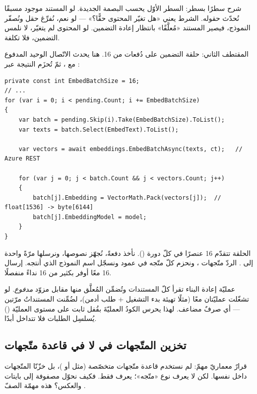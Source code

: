 شرح سطرًا بسطر: السطر الأوّل يحسب البصمة الجديدة. لو المستند موجود مسبقًا نُحدّث
حقوله. الشرط  يعني «هل تغيّر المحتوى حقًّا؟» — لو نعم،
نُفرِّغ حقل  ونُصفّر النموذج، فيصير المستند «مُعلَّقًا» بانتظار إعادة
التضمين. لو المحتوى لم يتغيّر، لا نلمس التضمين، فلا تكلفة.

المقتطف الثاني: حلقة التضمين على دُفعات من 16. هنا يحدث الاتّصال الوحيد المدفوع مع
، ثمّ تُحزَم النتيجة عبر :

\begin{english}
\begin{lstlisting}[language={[Sharp]C}]
private const int EmbedBatchSize = 16;
// ...
for (var i = 0; i < pending.Count; i += EmbedBatchSize)
{
    var batch = pending.Skip(i).Take(EmbedBatchSize).ToList();
    var texts = batch.Select(EmbedText).ToList();

    var vectors = await embeddings.EmbedBatchAsync(texts, ct);   // Azure REST

    for (var j = 0; j < batch.Count && j < vectors.Count; j++)
    {
        batch[j].Embedding = VectorMath.Pack(vectors[j]);  // float[1536] -> byte[6144]
        batch[j].EmbeddingModel = model;
    }
}
\end{lstlisting}
\end{english}

الحلقة تتقدّم 16 عنصرًا في كلّ دورة (). نأخذ دفعةً،
نُجهّز نصوصها، ونرسلها مرّةً واحدة إلى . الردّ متّجهات
، ونحزم كلّ متّجه في عمود  ونسجّل اسم النموذج الذي أنتجه.
إرسال 16 معًا أوفر بكثير من 16 نداءً منفصلًا.

\begin{secnote}
عمليّة إعادة البناء تقرأ كلّ المستندات وتُضمِّن المُعلَّق منها مقابل مزوّد
\emph{مدفوع}. لو تشغّلت عمليّتان معًا (مثلًا تهيئة بدء التشغيل + طلب أدمن)، لضُمِّنت
المستنداتُ مرّتين — أي صرفٌ مضاعف. لهذا يحرس الكودُ العمليّةَ بقُفل ثابت على مستوى
العمليّة () يُسلسِل الطلبات فلا تتداخل أبدًا.
\end{secnote}

\subsection{تخزين المتّجهات في  لا في قاعدة متّجهات}

قرارٌ معماريّ مهمّ: لم نستخدم قاعدة متّجهات متخصّصة (مثل  أو
)، بل خزّنّا المتّجهات داخل  نفسها. لكن  لا يعرف
نوع «متّجه»؛ يعرف  فقط. فكيف نحوّل مصفوفة  إلى بايتات
والعكس؟ هذه مهمّة الصفّ .

